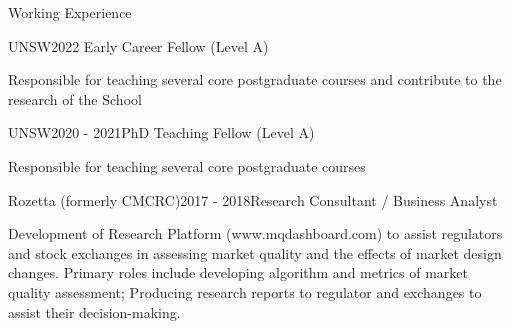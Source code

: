 \documentclass{resume} %
\begin{document}
%
%
%

\begin{rSection}{Working Experience}
	\begin{rSubsection}{UNSW}{2022 \- }{Early Career Fellow (Level A)}{}
		\item Responsible for teaching several core postgraduate courses and contribute to the research of the School
	\end{rSubsection}
	\begin{rSubsection}{UNSW}{2020 - 2021}{PhD Teaching Fellow (Level A)}{}
		\item Responsible for teaching several core postgraduate courses
	\end{rSubsection}
	\begin{rSubsection}{Rozetta (formerly CMCRC)}{2017 - 2018}{Research Consultant / Business Analyst}{}
		\item Development of Research Platform (www.mqdashboard.com) to assist regulators and stock exchanges in assessing market quality and the effects of market design changes. Primary roles include developing algorithm and metrics of market quality assessment; Producing research reports to regulator and exchanges to assist their decision-making.
	\end{rSubsection}
\end{rSection}
\end{document}
